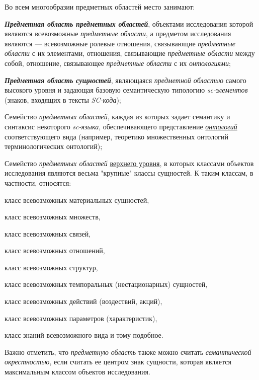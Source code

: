 \bigskip
Во всем многообразии предметных областей  место занимают:
\begin{textitemize}
	\item \textbf{\textit{Предметная область предметных областей}}, объектами исследования которой являются всевозможные \textit{предметные области}, а предметом исследования являются --- всевозможные ролевые отношения, связывающие \textit{предметные области} с их элементами, отношения, связывающие \textit{предметные области} между собой, отношение, связывающее \textit{предметные области} с их \textit{онтологиями};	
	\item \textbf{\textit{Предметная область сущностей}}, являющаяся \textit{предметной областью} самого высокого уровня и задающая базовую семантическую типологию \textit{sc-элементов} (знаков, входящих в тексты \textit{SC-кода});	
	\item Семейство \textit{предметных областей}, каждая из которых задает семантику и синтаксис некоторого \textit{sc-языка}, обеспечивающего представление \textit{\uline{онтологий}} соответствующего вида (например, теоретико множественных онтологий терминологических онтологий);	
	\item Семейство \textit{предметных областей} \uline{верхнего уровня}, в которых классами объектов исследования являются весьма "крупные"{} классы сущностей. К таким классам, в частности, относятся:	
	\begin{textitemize}	
		\item класс всевозможных материальных сущностей,	
		\item класс всевозможных множеств,	
		\item класс всевозможных связей,	
		\item класс всевозможных отношений,	
		\item класс всевозможных структур,	
		\item класс всевозможных темпоральных (нестационарных) сущностей,	
		\item класс всевозможных действий (воздествий, акций),	
		\item класс всевозможных параметров (характеристик),
		\item класс знаний всевозможного вида и тому подобное.	
	\end{textitemize}
\end{textitemize}

Важно отметить, что \textit{предметную область} также можно считать \textit{семантической окрестностью}, если считать ее центром знак сущности, которая является максимальным классом объектов исследования.

